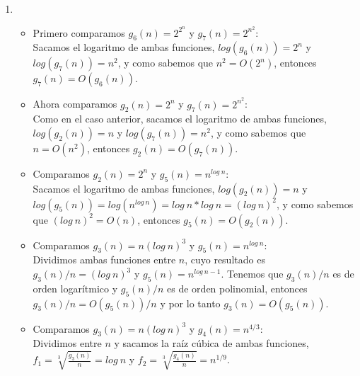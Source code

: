 \documentclass[12pt]{article}
\newenvironment{boenumerate}
               {\begin{enumerate}\renewcommand\labelenumi{\textbf{\theenumi.}}}
               {\end{enumerate}}
\begin{document}
\begin{boenumerate}
  Ahora veamos que $f_1(n) = n^{2.5} = n^{2+0.5} = n^2 \cdot n^{\frac{1}{2}}$, comparándolo con $f_6(n)$, al tener que $log_2(n) \leq n^{\frac{1}{2}} \Rightarrow n^2logn \leq n^{2.5}$, y notando que para valores mayores a $4$, $f_1(n)$ es mayor siempre que $f_6(n)$, podemos concluir que $f_6(n) \in O(f_1(n))$.
  
  Hemos visto en clase que $n^2 \in O(n^2logn)$ y que $n \in O(n^2)$. Por transitividad, podemos ver que 
  $f_3(n) \in O(f_6(n))$. De cualquier manera, podemos ver que a partir de valores como 3, $f_6$ será siempre mayor a $f_3$.
  

  Finalmente, es claro que al no estar definidas las raíces negativas en los reales, desde el 0 a valores positivos, la función $f_3$ es mayor a $f_2$.

  Así pues, queda en orden creciente nuestra lista de funciones como sigue:
  $f_2,f_3,f_6,f_1,f_4,f_5$.
\item
  \begin{itemize}
    \item Primero comparamos $g_6(n) = 2^{2^n}$ y $g_7(n) = 2^{n^2}$: \\
      Sacamos el logaritmo de ambas funciones, $log(g_6(n)) = 2^n$ y $log(g_7(n)) = n^2$, y como sabemos que $n^2 = O(2^n)$, entonces $g_7(n) = O(g_6(n))$.
    \item Ahora comparamos $g_2(n) = 2^n$ y $g_7(n) = 2^{n^2}$: \\
      Como en el caso anterior, sacamos el logaritmo de ambas funciones, $log(g_2(n)) = n$ y $log(g_7(n)) = n^2$, y como sabemos que $n = O(n^2)$, entonces $g_2(n) = O(g_7(n))$.
    \item Comparamos $g_2(n) = 2^n$ y $g_5(n) = n^{log\ n}$: \\
      Sacamos el logaritmo de ambas funciones, $log(g_2(n)) = n$ y $log(g_5(n)) = log(n^{log\ n}) = log\ n * log\ n = (log\ n)^2$, y como sabemos que $(log\ n)^2 = O(n)$, entonces $g_5(n) = O(g_2(n))$.
    \item Comparamos $g_3(n) = n(log\ n)^3$ y $g_5(n) = n^{log\ n}$: \\
      Dividimos ambas funciones entre $n$, cuyo resultado es $g_3(n)/n = (log\ n)^3$ y $g_5(n) = n^{log\ n - 1}$. Tenemos que $g_3(n)/n$ es de orden logarítmico y $g_5(n)/n$ es de orden polinomial, entonces $g_3(n)/n = O(g_5(n))/n$ y por lo tanto $g_3(n) = O(g_5(n))$.
    \item Comparamos $g_3(n) = n(log\ n)^3$ y $g_4(n) = n^{4/3}$: \\
      Dividimos entre $n$ y sacamos la raíz cúbica de ambas funciones, $f_1 = \sqrt[3]{\frac{g_3(n)}{n}} = log\ n$ y $f_2 = \sqrt[3]{\frac{g_4(n)}{n}} = n^{1/9}$. \\

\end{itemize}
\end{boenumerate}
\end{document}
